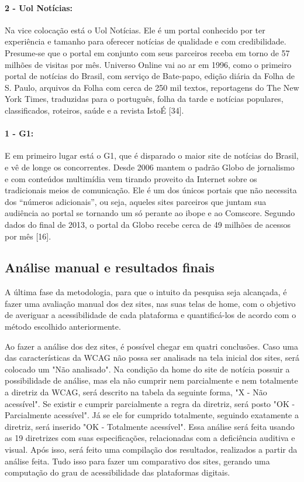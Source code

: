 \documentclass[a4paper]{article}
\begin{document}
\begin{titlepage}
\paragraph{2 - Uol Notícias: }

Na vice colocação está o Uol Notícias. Ele é um portal conhecido por ter experiência e tamanho para oferecer notícias de qualidade e com credibilidade. Presume-se que o portal em conjunto com seus parceiros receba em torno de 57 milhões de visitas por mês. Universo Online vai ao ar em 1996, como o primeiro portal de notícias do Brasil, com serviço de Bate-papo, edição diária da Folha de S. Paulo, arquivos da Folha com cerca de 250 mil textos, reportagens do The New York Times, traduzidas para o português, folha da tarde e notícias populares, classificados, roteiros, saúde e a revista IstoÉ [34].

\paragraph{1 - G1: }

E em primeiro lugar está o G1, que é disparado o maior site de notícias do Brasil, e vê de longe os concorrentes. Desde 2006 mantem o padrão Globo de jornalismo e com conteúdos multimídia vem tirando proveito da Internet sobre os tradicionais meios de comunicação. Ele é um dos únicos portais que não necessita dos ``números adicionais”, ou seja, aqueles sites parceiros que juntam sua audiência ao portal se tornando um só perante ao ibope e ao Comscore. Segundo dados do final de 2013, o portal da Globo recebe cerca de 49 milhões de acessos por mês [16].

\subsection{Análise manual e resultados finais}

A última fase da metodologia, para que o intuito da pesquisa seja alcançada, é fazer uma avaliação manual dos dez sites, nas suas telas de home, com o objetivo de averiguar a acessibilidade de cada plataforma e quantificá-los de acordo com o método escolhido anteriormente.

Ao fazer a análise dos dez sites, é possível chegar em quatri conclusões. Caso uma das características da WCAG não possa ser analisads na tela inicial dos sites, será colocado um "Não analisado".
Na condição da home do site de notícia possuir a possibilidade de análise, mas ela não cumprir nem parcialmente e nem totalmente a diretriz da WCAG, será descrito na tabela da seguinte forma, "X - Não acessível".
Se existir e cumprir parcialmente a regra da diretriz, será posto "OK - Parcialmente acessível".
Já se ele for cumprido totalmente, seguindo exatamente a diretriz, será inserido "OK - Totalmente acessível".
Essa análise será feita usando as 19 diretrizes com suas especificações, relacionadas com a deficiência auditiva e visual. Após isso, será feito uma compilação dos resultados, realizados a partir da análise feita. Tudo isso para fazer um comparativo dos sites, gerando uma computação do grau de acessibilidade das plataformas digitais.


\end{titlepage}
\end{document}
